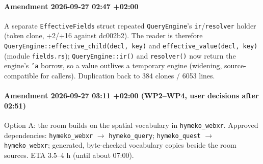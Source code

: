 \documentclass[11pt]{article}
\begin{document}
\paragraph{Amendment 2026-09-27 02:47 +02:00} A separate \texttt{EffectiveFields} struct repeated
\texttt{QueryEngine}'s \texttt{ir}/\texttt{resolver} holder (token clone, +2/+16 against dc002b2).
The reader is therefore \texttt{QueryEngine::effective\_child(decl, key)} and
\texttt{effective\_value(decl, key)} (module \texttt{fields.rs}); \texttt{QueryEngine::ir()} and
\texttt{resolver()} now return the engine's \texttt{'a} borrow, so a value outlives a temporary
engine (widening, source-compatible for callers). Duplication back to 384 clones / 6053 lines.

\paragraph{Amendment 2026-09-27 03:11 +02:00 (WP2--WP4, user decisions after 02:51)} Option A: the
room builds on the spatial vocabulary in \texttt{hymeko\_webxr}. Approved dependencies:
\texttt{hymeko\_webxr} $\rightarrow$ \texttt{hymeko\_query}; \texttt{hymeko\_quest} $\rightarrow$
\texttt{hymeko\_webxr}; generated, byte-checked vocabulary copies beside the room sources.
ETA 3.5--4 h (until about 07:00).
\end{document}
